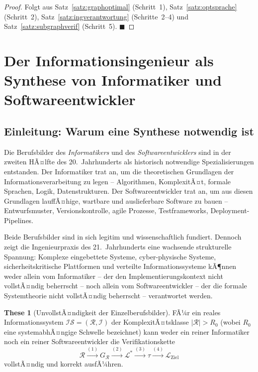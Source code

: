 ﻿\documentclass[a4paper,12pt]{article}
\theoremstyle{definition}
\newtheorem{these}{These}
\begin{document}
\begin{proof}
Folgt aus Satz~\ref{satz:graphoptimal} (Schritt~1),
Satz~\ref{satz:optsprache} (Schritt~2),
Satz~\ref{satz:ingverantwortung} (Schritte~2--4) und
Satz~\ref{satz:subgraphverif} (Schritt~5). $\blacksquare$
\end{proof}

\section{Der Informationsingenieur als Synthese von Informatiker und Softwareentwickler}
\label{sec:synthese}

\subsection{Einleitung: Warum eine Synthese notwendig ist}

Die Berufsbilder des \emph{Informatikers} und des \emph{Softwareentwicklers} sind in der
zweiten HÃ¤lfte des 20.~Jahrhunderts als historisch notwendige Spezialisierungen entstanden.
Der Informatiker trat an, um die theoretischen Grundlagen der Informationsverarbeitung zu
legen -- Algorithmen, KomplexitÃ¤t, formale Sprachen, Logik, Datenstrukturen. Der
Softwareentwickler trat an, um aus diesen Grundlagen lauffÃ¤hige, wartbare und auslieferbare
Software zu bauen -- Entwurfsmuster, Versionskontrolle, agile Prozesse, Testframeworks,
Deployment-Pipelines.

Beide Berufsbilder sind in sich legitim und wissenschaftlich fundiert. Dennoch zeigt die
Ingenieurpraxis des 21.~Jahrhunderts eine wachsende strukturelle Spannung: Komplexe
eingebettete Systeme, cyber-physische Systeme, sicherheitskritische Plattformen und
verteilte Informationssysteme kÃ¶nnen weder allein vom Informatiker -- der den
Implementierungskontext nicht vollstÃ¤ndig beherrscht -- noch allein vom Softwareentwickler
-- der die formale Systemtheorie nicht vollstÃ¤ndig beherrscht -- verantwortet werden.

\begin{these}[UnvollstÃ¤ndigkeit der Einzelberufsbilder]
\label{these:unvollst}
FÃ¼r ein reales Informationssystem $\mathcal{IS} = (\mathcal{R}, \mathcal{I})$ der
KomplexitÃ¤tsklasse $|\mathcal{R}| > R_0$ (wobei $R_0$ eine systemabhÃ¤ngige Schwelle
bezeichnet) kann weder ein reiner Informatiker noch ein reiner Softwareentwickler
die Verifikationskette
\[
  \mathcal{R}
  \xrightarrow{(1)} G_\mathcal{R}
  \xrightarrow{(2)} \mathcal{L}^*
  \xrightarrow{(3)} \tau
  \xrightarrow{(4)} \mathcal{L}_{\text{Ziel}}
\]
vollstÃ¤ndig und korrekt ausfÃ¼hren.
\end{these}
\end{document}
